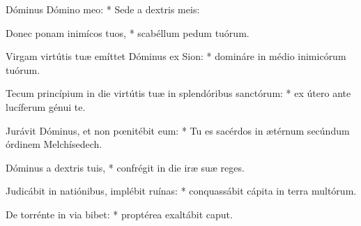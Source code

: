 \begin{psalmus}

 Dóminus Dómino meo: * Sede a dextris meis:

Donec ponam inimícos tuos, * scabéllum pedum tuórum.

Virgam virtútis tuæ emíttet Dóminus ex Sion: * domináre in médio inimicórum tuórum.

Tecum princípium in die virtútis tuæ in splendóribus sanctórum: * ex útero ante lucíferum génui te.

Jurávit Dóminus, et non pœnitébit eum: * Tu es sacérdos in ætérnum secúndum órdinem Melchísedech.

Dóminus a dextris tuis, * confrégit in die iræ suæ reges.

Judicábit in natiónibus, implébit ruínas: * conquassábit cápita in terra multórum.

De torrénte in via bibet: * proptérea exaltábit caput.

\end{psalmus}
